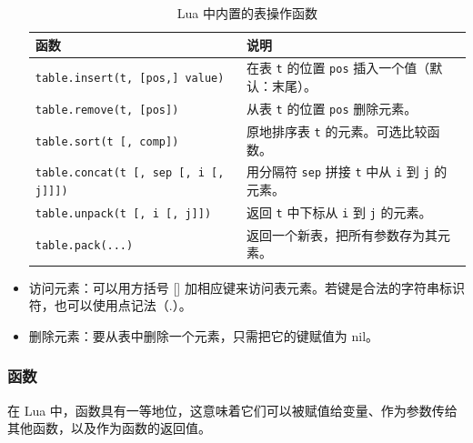 \begin{itemize}
\begin{table}[htbp]
\centering
\caption{Lua 中内置的表操作函数}
\begin{tabular}{@{}ll@{}}
\toprule
\textbf{函数} & \textbf{说明} \\
\midrule
\texttt{table.insert(t, [pos,] value)} & 在表 \texttt{t} 的位置 \texttt{pos} 插入一个值（默认：末尾）。 \\
\texttt{table.remove(t, [pos])}        & 从表 \texttt{t} 的位置 \texttt{pos} 删除元素。 \\
\texttt{table.sort(t [, comp])}        & 原地排序表 \texttt{t} 的元素。可选比较函数。 \\
\texttt{table.concat(t [, sep [, i [, j]]])} & 用分隔符 \texttt{sep} 拼接 \texttt{t} 中从 \texttt{i} 到 \texttt{j} 的元素。 \\
\texttt{table.unpack(t [, i [, j]])}   & 返回 \texttt{t} 中下标从 \texttt{i} 到 \texttt{j} 的元素。 \\
\texttt{table.pack(...)}          & 返回一个新表，把所有参数存为其元素。 \\

\bottomrule
\end{tabular}
\end{table}






\item 访问元素：可以用方括号 [] 加相应键来访问表元素。若键是合法的字符串标识符，也可以使用点记法（.）。
\item 删除元素：要从表中删除一个元素，只需把它的键赋值为 nil。
\end{itemize}

\subsubsection{函数}

在 Lua 中，函数具有一等地位，这意味着它们可以被赋值给变量、作为参数传给其他函数，以及作为函数的返回值。

